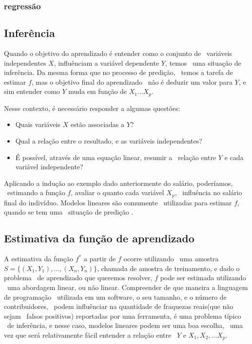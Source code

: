 \subsubsection{regressão}


\subsection{Inferência}

Quando o objetivo do aprendizado é entender como o conjunto de \
variáveis independentes $X$, influênciam a variável dependente $Y$, temos \
uma situação de inferência. Da mesma forma que no processo de predição, \
temos a tarefa de estimar $f$, mas o objetivo final do aprendizado \
não é deduzir um valor para $Y$, e sim entender como $Y$ muda em função de $X_1...X_p$.

Nesse contexto, é necessário responder a algumas questões:

\begin{itemize}
\item Quais variáveis $X$ estão associadas a $Y$?
\item Qual a relação entre o resultado, e as variáveis independentes?
\item É possível, através de uma equação linear, resumir a \
        relação entre $Y$ e cada variável independente?
\end{itemize}

Aplicando a indução ao exemplo dado anteriormente do salário, poderíamos, \
estimando a função $f$, avaliar o quanto cada variável $X_p$, \
influência no salário final do indivíduo. Modelos lineares são comumente \
utilizadas para estimar $f$, quando se tem uma \
situação de predição \cite{Jordan}.

\subsection{Estimativa da função de aprendizado}
A estimativa da função $f^*$ a partir de $f$ ocorre utilizando \
uma amostra $S = \{(X_1, Y_1),...,(X_n, Y_n)\}$,
chamada de amostra de treinamento\cite{Malhotra}, e dado o problema \
de aprendizado que queremos resolver, $f$ pode ser estimada utilizando \
uma abordagem linear, ou não linear.
Compreender de que maneira a linguagem de programação \
utilizada em um software, o seu tamanho, e o número de contribuidores, \
podem influênciar na quantidade de fraquezas reais(que não sejam \
falsos positivos) reportadas por uma ferramenta, é uma problema típico \
de inferência, e nesse caso, modelos lineares podem ser uma boa escolha, \
uma vez que será relativamente fácil entender a relação entre \
$Y$ e $X_1,X_2,...X_p$\cite{Jordan}.


